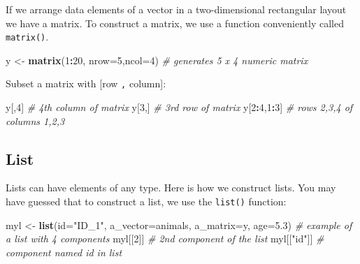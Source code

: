 \documentclass[
]{book}
\newenvironment{Shaded}{\begin{snugshade}}{\end{snugshade}}
\newcommand{\AttributeTok}[1]{\textcolor[rgb]{0.13,0.29,0.53}{#1}}
\newcommand{\CommentTok}[1]{\textcolor[rgb]{0.56,0.35,0.01}{\textit{#1}}}
\newcommand{\DecValTok}[1]{\textcolor[rgb]{0.00,0.00,0.81}{#1}}
\newcommand{\FloatTok}[1]{\textcolor[rgb]{0.00,0.00,0.81}{#1}}
\newcommand{\FunctionTok}[1]{\textcolor[rgb]{0.13,0.29,0.53}{\textbf{#1}}}
\newcommand{\NormalTok}[1]{#1}
\newcommand{\OtherTok}[1]{\textcolor[rgb]{0.56,0.35,0.01}{#1}}
\newcommand{\SpecialCharTok}[1]{\textcolor[rgb]{0.81,0.36,0.00}{\textbf{#1}}}
\newcommand{\StringTok}[1]{\textcolor[rgb]{0.31,0.60,0.02}{#1}}
\begin{document}
If we arrange data elements of a vector in a two-dimensional rectangular layout we have a matrix. To construct a matrix, we use a function conveniently called \texttt{matrix()}.

\begin{Shaded}
\begin{Highlighting}[]
\NormalTok{y }\OtherTok{\textless{}{-}} \FunctionTok{matrix}\NormalTok{(}\DecValTok{1}\SpecialCharTok{:}\DecValTok{20}\NormalTok{, }\AttributeTok{nrow=}\DecValTok{5}\NormalTok{,}\AttributeTok{ncol=}\DecValTok{4}\NormalTok{) }\CommentTok{\# generates 5 x 4 numeric matrix}
\end{Highlighting}
\end{Shaded}

Subset a matrix with {[}row \texttt{,} column{]}:

\begin{Shaded}
\begin{Highlighting}[]
\NormalTok{y[,}\DecValTok{4}\NormalTok{]       }\CommentTok{\# 4th column of matrix}
\NormalTok{y[}\DecValTok{3}\NormalTok{,]       }\CommentTok{\# 3rd row of matrix}
\NormalTok{y[}\DecValTok{2}\SpecialCharTok{:}\DecValTok{4}\NormalTok{,}\DecValTok{1}\SpecialCharTok{:}\DecValTok{3}\NormalTok{]  }\CommentTok{\# rows 2,3,4 of columns 1,2,3}
\end{Highlighting}
\end{Shaded}

\subsection{List}\label{list}

Lists can have elements of any type. Here is how we construct lists. You may have guessed that to construct a list, we use the \texttt{list()} function:

\begin{Shaded}
\begin{Highlighting}[]
\NormalTok{myl }\OtherTok{\textless{}{-}} \FunctionTok{list}\NormalTok{(}\AttributeTok{id=}\StringTok{"ID\_1"}\NormalTok{, }\AttributeTok{a\_vector=}\NormalTok{animals, }\AttributeTok{a\_matrix=}\NormalTok{y, }\AttributeTok{age=}\FloatTok{5.3}\NormalTok{) }\CommentTok{\# example of a list with 4 components}
\NormalTok{myl[[}\DecValTok{2}\NormalTok{]] }\CommentTok{\# 2nd component of the list}
\NormalTok{myl[[}\StringTok{"id"}\NormalTok{]] }\CommentTok{\# component named id in list}
\end{Highlighting}
\end{Shaded}
\end{document}
